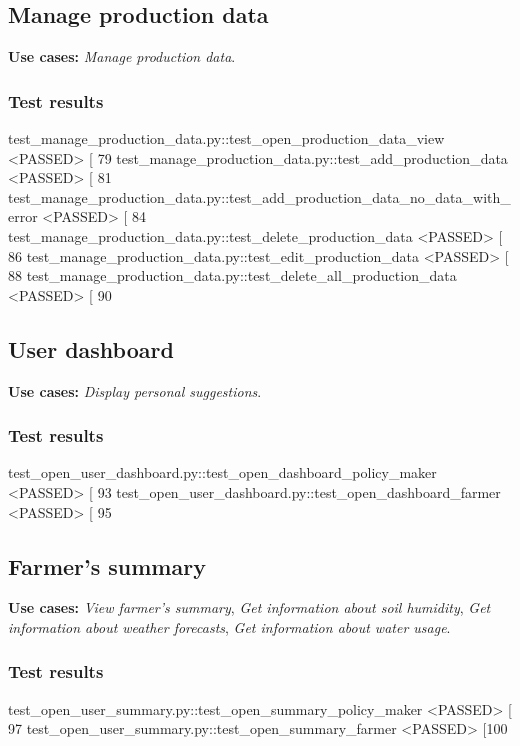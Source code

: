 \subsection{Manage production data}

\textbf{Use cases:} \textit{Manage production data}.

\subsubsection*{Test results}
\begin{verbnobox}[\footnotesize \vbdelim]
test_manage_production_data.py::test_open_production_data_view <PASSED>              [ 79%
test_manage_production_data.py::test_add_production_data <PASSED>                    [ 81%
test_manage_production_data.py::test_add_production_data_no_data_with_error <PASSED> [ 84%
test_manage_production_data.py::test_delete_production_data <PASSED>                 [ 86%
test_manage_production_data.py::test_edit_production_data <PASSED>                   [ 88%
test_manage_production_data.py::test_delete_all_production_data <PASSED>             [ 90%
\end{verbnobox}

\subsection{User dashboard}

\textbf{Use cases:} \textit{Display personal suggestions}.

\subsubsection*{Test results}
\begin{verbnobox}[\footnotesize \vbdelim]
test_open_user_dashboard.py::test_open_dashboard_policy_maker <PASSED>     [ 93%
test_open_user_dashboard.py::test_open_dashboard_farmer <PASSED>           [ 95%
\end{verbnobox}

\subsection{Farmer's summary}

\textbf{Use cases:} \textit{View farmer's summary}, \textit{Get information about soil humidity}, \textit{Get information about weather forecasts}, \textit{Get information about water usage}.

\subsubsection*{Test results}
\begin{verbnobox}[\footnotesize \vbdelim]
test_open_user_summary.py::test_open_summary_policy_maker <PASSED>         [ 97%
test_open_user_summary.py::test_open_summary_farmer <PASSED>               [100%
\end{verbnobox}
